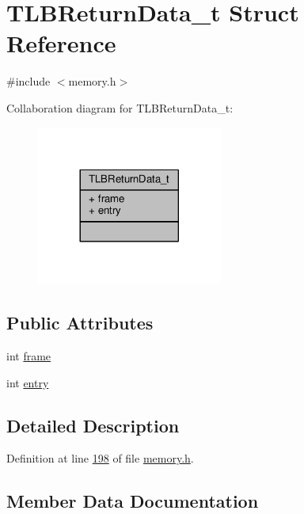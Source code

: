 \hypertarget{structTLBReturnData__t}{}\section{T\+L\+B\+Return\+Data\+\_\+t Struct Reference}
\label{structTLBReturnData__t}


{\ttfamily \#include $<$memory.\+h$>$}



Collaboration diagram for T\+L\+B\+Return\+Data\+\_\+t\+:
\nopagebreak
\begin{figure}[H]
\begin{center}
\leavevmode
\includegraphics[width=173pt]{structTLBReturnData__t__coll__graph}
\end{center}
\end{figure}
\subsection*{Public Attributes}
\begin{DoxyCompactItemize}
\item 
int \hyperlink{structTLBReturnData__t_ac4bdfa0ee74b50048e94321426877439}{frame}
\item 
int \hyperlink{structTLBReturnData__t_a58914c8a985e6cdb2f48a56ab41a6985}{entry}
\end{DoxyCompactItemize}


\subsection{Detailed Description}


Definition at line \hyperlink{memory_8h_source_l00198}{198} of file \hyperlink{memory_8h_source}{memory.\+h}.



\subsection{Member Data Documentation}
